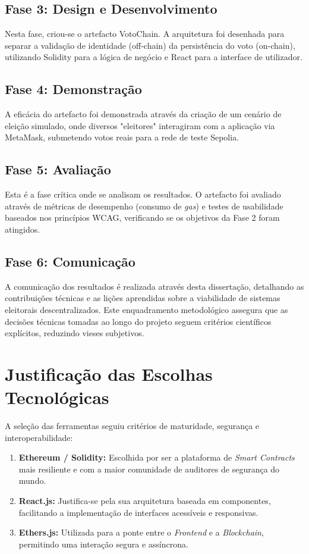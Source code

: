 \subsection{Fase 3: Design e Desenvolvimento}
Nesta fase, criou-se o artefacto VotoChain. A arquitetura foi desenhada para separar a validação de identidade (off-chain) da persistência do voto (on-chain), utilizando Solidity para a lógica de negócio e React para a interface de utilizador.

\subsection{Fase 4: Demonstração}
A eficácia do artefacto foi demonstrada através da criação de um cenário de eleição simulado, onde diversos "eleitores" interagiram com a aplicação via MetaMask, submetendo votos reais para a rede de teste Sepolia.

\subsection{Fase 5: Avaliação}
Esta é a fase crítica onde se analisam os resultados. O artefacto foi avaliado através de métricas de desempenho (consumo de \textit{gas}) e testes de usabilidade baseados nos princípios WCAG, verificando se os objetivos da Fase 2 foram atingidos.

\subsection{Fase 6: Comunicação}
A comunicação dos resultados é realizada através desta dissertação, detalhando as contribuições técnicas e as lições aprendidas sobre a viabilidade de sistemas eleitorais descentralizados. Este enquadramento metodológico assegura que as decisões técnicas tomadas ao longo do projeto seguem critérios científicos explícitos, reduzindo vieses subjetivos.

\section{Justificação das Escolhas Tecnológicas}

A seleção das ferramentas seguiu critérios de maturidade, segurança e interoperabilidade:
\begin{enumerate}
    \item \textbf{Ethereum / Solidity:} Escolhida por ser a plataforma de \textit{Smart Contracts} mais resiliente e com a maior comunidade de auditores de segurança do mundo.
    \item \textbf{React.js:} Justifica-se pela sua arquitetura baseada em componentes, facilitando a implementação de interfaces acessíveis e responsivas.
    \item \textbf{Ethers.js:} Utilizada para a ponte entre o \textit{Frontend} e a \textit{Blockchain}, permitindo uma interação segura e assíncrona.
\end{enumerate}

